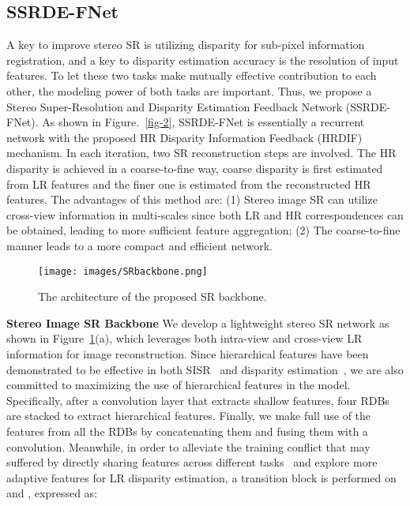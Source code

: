 \documentclass[sigconf]{acmart}
\begin{document}
\subsection{SSRDE-FNet}\label{network}
A key to improve stereo SR is utilizing disparity for sub-pixel information registration, and a key to disparity estimation accuracy is the resolution of input features. To let these two tasks make mutually effective contribution to each other, the modeling power of both tasks are important. Thus, we propose a Stereo Super-Resolution and Disparity Estimation Feedback Network (SSRDE-FNet). As shown in Figure.~\ref{fig-2}, SSRDE-FNet is essentially a recurrent network with the proposed HR Disparity Information Feedback (HRDIF) mechanism. In each iteration, two SR reconstruction steps are involved. The HR disparity is achieved in a coarse-to-fine way, coarse disparity is first estimated from LR features and the finer one is estimated from the reconstructed HR features. The advantages of this method are: (1) Stereo image SR can utilize cross-view information in multi-scales since both LR and HR correspondences can be obtained, leading to more sufficient feature aggregation; (2) The coarse-to-fine manner leads to a more compact and efficient network.

\begin{figure}[t]
  \centering
  \texttt{[image: images/SRbackbone.png]}
  \begin{minipage}[c]{1\textwidth}
  \end{minipage}
  \setlength{\belowcaptionskip}{-0pt} 
  \setlength{\belowcaptionskip}{-10pt}
  \caption{The architecture of the proposed SR backbone.}
  \label{fig-3}
\end{figure}

\textbf{Stereo Image SR Backbone}
We develop a lightweight stereo SR network as shown in Figure~\ref{fig-3}(a), which leverages both intra-view and cross-view LR information for image reconstruction. Since hierarchical features have been demonstrated to be effective in both SISR~\cite{Li2018MultiscaleRN,Zhang2018ResidualDN} and disparity estimation~\cite{Kendall2017EndtoEndLO,Chang2018PyramidSM}, we are also committed to maximizing the use of hierarchical features in the model. Specifically, after a convolution layer that extracts shallow features, four RDBs~\cite{Zhang2018ResidualDN} are stacked to extract hierarchical features. Finally, we make full use of the features from all the RDBs by concatenating them and fusing them with a  convolution. Meanwhile, in order to alleviate the training conflict that may suffered by directly sharing features across different tasks~\cite{Sener2018MultiTaskLA} and explore more adaptive features for LR disparity estimation, a transition block is performed on  and , expressed as:
\end{document}
